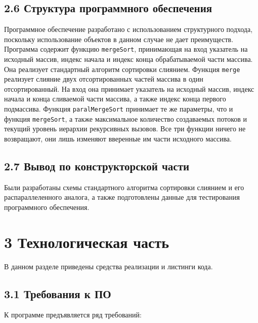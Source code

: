 \documentclass[12pt, a4paper]{report}
\begin{document}
\section*{2.6 Структура программного обеспечения}

Программное обеспечение разработано с использованием структурного подхода, поскольку использование объектов в данном случае не дает преимуществ. Программа содержит функцию \verb|mergeSort|, принимающая на вход указатель на исходный массив, индекс начала и индекс конца обрабатываемой части массива. Она реализует стандартный алгоритм сортировки слиянием. Функция \verb|merge| реализует слияние двух отсортированных частей массива в один отсортированный. На вход она принимает указатель на исходный массив, индекс начала и конца сливаемой части массива, а также индекс конца первого подмассива. Функция \verb|paralMergeSort| принимает те же параметры, что и функция \verb|mergeSort|, а также максимальное количество создаваемых потоков и текущий уровень иерархии рекурсивных вызовов. Все три функции ничего не возвращают, они лишь изменяют вверенные им части исходного массива. 

\section*{2.7 Вывод по конструкторской части}

Были разработаны схемы стандартного алгоритма сортировки слиянием и его распараллеленного аналога, а также подготовлены данные для тестирования программного обеспечения. 

\chapter*{3 Технологическая часть}

В данном разделе приведены средства реализации и листинги кода.

\section*{3.1 Требования к ПО}

К программе предъявляется ряд требований:
\end{document}
